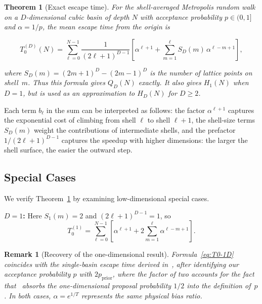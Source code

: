 \documentclass[conference]{IEEEtran}
\newtheorem{theorem}{Theorem}
\newtheorem{remark}{Remark}
\begin{document}
\begin{theorem}[Exact escape time]
\label{thm:exact-escape}
For the shell-averaged Metropolis random walk on a $D$-dimensional cubic
basin of depth $N$ with acceptance probability $p \in (0,1]$ and
$\alpha = 1/p$, the mean escape time from the origin is
{\small
\begin{equation}
\label{eq:T0-exact}
\boxed{
T_0^{(D)}(N) = \sum_{\ell=0}^{N-1}
\frac{1}{(2\ell+1)^{D-1}}
\left[\alpha^{\ell+1}
+ \sum_{m=1}^{\ell} S_D(m)\,\alpha^{\ell-m+1}\right],
}
\end{equation}
\par}
where $S_D(m) = (2m+1)^D - (2m-1)^D$ is the number of lattice points on
shell~$m$.
Thus this formula gives $Q_D(N)$ exactly. It also gives $H_1(N)$
when $D=1$, but is used as an approximation to $H_D(N)$ for $D\ge2$.
\end{theorem}

Each term $b_\ell$ in the sum can be interpreted as follows: the factor
$\alpha^{\ell+1}$ captures the exponential cost of climbing from shell
$\ell$ to shell $\ell+1$, the shell-size terms $S_D(m)$ weight the
contributions of intermediate shells, and the prefactor
$1/(2\ell+1)^{D-1}$ captures the speedup with higher dimensions: the larger the
shell surface, the easier the outward step.

\subsection{Special Cases}

We verify Theorem~\ref{thm:exact-escape} by examining low-dimensional
special cases.

\textbf{$D=1$:} Here $S_1(m) = 2$ and $(2\ell+1)^{D-1}=1$, so
\begin{equation}
\label{eq:T0-1D}
T_0^{(1)} = \sum_{\ell=0}^{N-1}
\left[\alpha^{\ell+1} + 2\sum_{m=1}^{\ell} \alpha^{\ell-m+1}\right].
\end{equation}

\begin{remark}[Recovery of the one-dimensional result]
\label{rmk:1D}
Formula~\eqref{eq:T0-1D} coincides with the single-basin escape
time derived in~\cite{ramachandran2026}, after identifying our acceptance
probability $p$ with $2p_{\mathrm{prior}}$, where the factor of two accounts
for the fact that~\cite{ramachandran2026} absorbs the one-dimensional
proposal probability $1/2$ into the definition of~$p$.
In both cases, $\alpha = e^{1/T}$ represents the same physical bias ratio.
\end{remark}
\end{document}
